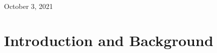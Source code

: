 \documentclass[11pt,a4paper]{article}
\begin{document}
\begin{titlepage}
	
	\vfill\vfill\vfill %
	
	{\large October 3, 2021} %
	
	
	 
	
	\vfill %
	
    \end{titlepage}
	
	\section{Introduction and  Background}
	
	
\end{document}
